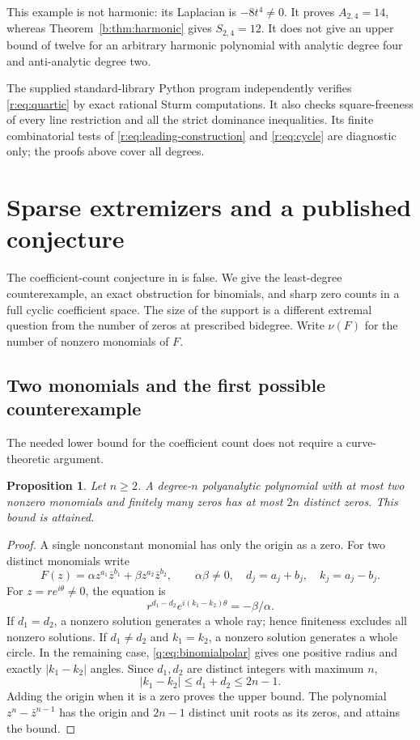 \documentclass[UTF8,11pt]{ctexart}
\newtheorem{prop}[thm]{Proposition}
\theoremstyle{definition}
\numberwithin{equation}{section}
\begin{document}
This example is not harmonic: its Laplacian is $-8t^4\ne0$.
It proves $A_{2,4}=14$, whereas Theorem~\ref{b:thm:harmonic} gives
$S_{2,4}=12$. It does not give an upper bound of twelve for an arbitrary
harmonic polynomial with analytic degree four and anti-analytic
degree two.

The supplied standard-library Python program independently verifies
\eqref{r:eq:quartic} by exact rational Sturm computations. It also checks
square-freeness of every line restriction and all the strict dominance
inequalities. Its finite combinatorial tests of
\eqref{r:eq:leading-construction} and \eqref{r:eq:cycle} are diagnostic only;
the proofs above cover all degrees.

\section{Sparse extremizers and a published conjecture}\label{q:sec:sparse}
The coefficient-count conjecture in \cite[Remark~4.4, p.~16]{SZ24}
is false. We give the least-degree counterexample, an exact obstruction
for binomials, and sharp zero counts in a full cyclic coefficient space.
The size of the support is a different extremal question from the
number of zeros at prescribed bidegree. Write $\nu(F)$ for the number
of nonzero monomials of $F$.
\subsection{Two monomials and the first possible counterexample}
\label{q:sec:binomial}
The needed lower bound for the coefficient count does not require a
curve-theoretic argument.
\begin{prop}\label{q:prop:binomial}
Let $n\ge2$. A degree-$n$ polyanalytic polynomial with at most two
nonzero monomials and finitely many zeros has at most $2n$ distinct
zeros. This bound is attained.
\end{prop}
\begin{proof}
A single nonconstant monomial has only the origin as a zero. For two
distinct monomials write
\[
 F(z)=\alpha z^{a_1}\bar z^{b_1}
       +\beta z^{a_2}\bar z^{b_2},\qquad \alpha\beta\ne0,
 \quad d_j=a_j+b_j,\quad k_j=a_j-b_j.
\]
For $z=re^{i\theta}\ne0$, the equation is
\begin{equation}\label{q:eq:binomialpolar}
 r^{d_1-d_2}e^{i(k_1-k_2)\theta}=-\beta/\alpha.
\end{equation}
If $d_1=d_2$, a nonzero solution generates a whole ray; hence finiteness
excludes all nonzero solutions. If $d_1\ne d_2$ and $k_1=k_2$, a nonzero
solution generates a whole circle. In the remaining case,
\eqref{q:eq:binomialpolar} gives one positive radius and exactly
$|k_1-k_2|$ angles. Since $d_1,d_2$ are distinct integers with maximum
$n$,
\[
 |k_1-k_2|\le d_1+d_2\le2n-1.
\]
Adding the origin when it is a zero proves the upper bound. The
polynomial $z^n-\bar z^{n-1}$ has the origin and $2n-1$ distinct unit
roots as its zeros, and attains the bound.
\end{proof}
\end{document}

